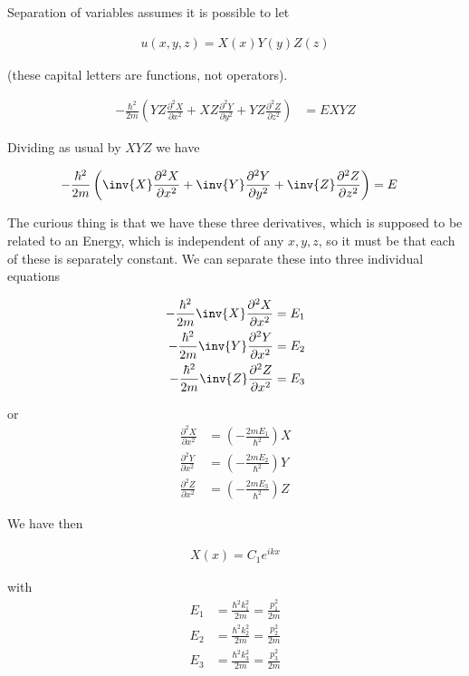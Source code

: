 Separation of variables assumes it is possible to let

\begin{align*}
u(x,y,z) = X(x) Y(y) Z(z)
\end{align*}

(these capital letters are functions, not operators).

\begin{align*}
-\frac{\hbar^2}{2m} \left(
YZ \frac{\partial^2 X}{\partial {x}^2}
+ XZ \frac{\partial^2 Y}{\partial {y}^2}
+ YZ \frac{\partial^2 Z}{\partial {z}^2}\right)
&= E X Y Z
\end{align*}

Dividing as usual by $XYZ$ we have

\begin{align*}
-\frac{\hbar^2}{2m} \left(
\inv{X} \frac{\partial^2 X}{\partial {x}^2}
+ \inv{Y} \frac{\partial^2 Y}{\partial {y}^2}
+ \inv{Z} \frac{\partial^2 Z}{\partial {z}^2} \right)
&= E
\end{align*}

The curious thing is that we have these three derivatives, which is supposed to be related to an Energy, which is independent of any $x,y,z$, so it must be that each of these is separately constant.  We can separate these into three individual equations

\begin{align*}
-\frac{\hbar^2}{2m} \inv{X} \frac{\partial^2 X}{\partial {x}^2} &= E_1 \\
-\frac{\hbar^2}{2m} \inv{Y} \frac{\partial^2 Y}{\partial {x}^2} &= E_2 \\
-\frac{\hbar^2}{2m} \inv{Z} \frac{\partial^2 Z}{\partial {x}^2} &= E_3
\end{align*}

or
\begin{align*}
\frac{\partial^2 X}{\partial {x}^2} &= \left( - \frac{2m E_1}{\hbar^2} \right) X  \\
\frac{\partial^2 Y}{\partial {x}^2} &= \left( - \frac{2m E_2}{\hbar^2} \right) Y  \\
\frac{\partial^2 Z}{\partial {x}^2} &= \left( - \frac{2m E_3}{\hbar^2} \right) Z
\end{align*}

We have then

\begin{align*}
X(x) = C_1 e^{i k x}
\end{align*}

with
\begin{align*}
E_1 &= \frac{\hbar^2 k_1^2 }{2m} = \frac{p_1^2}{2m} \\
E_2 &= \frac{\hbar^2 k_2^2 }{2m} = \frac{p_2^2}{2m} \\
E_3 &= \frac{\hbar^2 k_3^2 }{2m} = \frac{p_3^2}{2m}
\end{align*}

